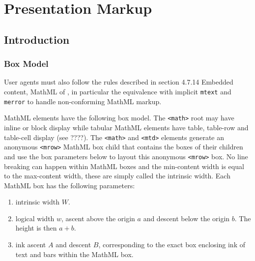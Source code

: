 \section{Presentation Markup}

\subsection{Introduction}

\subsubsection{Box Model}

User agents must also follow the rules described in section 4.7.14
Embedded content, MathML of \cite{HTML5}, in particular the equivalence with
implicit {\tt mtext} and {\tt merror} to handle non-conforming MathML markup.

MathML elements have the following box model. The {\tt <math>} root may have
inline or block display while tabular MathML elements have table, table-row and
table-cell display (see ????). The {\tt <math>} and {\tt <mtd>} elements
generate an anonymous {\tt <mrow>} MathML box child that contains the boxes of
their children and use the box parameters below to layout this anonymous
{\tt <mrow>} box.
No line breaking can happen within MathML boxes and the min-content width is
equal to the max-content width, these are simply called the intrinsic width.
Each MathML box has the following parameters:

\begin{enumerate}
\item intrinsic width $W$.
\item logical width $w$, ascent above the origin $a$ and descent below the
  origin $b$. The height is then $a+b$.
\item ink ascent $A$ and descent $B$, corresponding to the exact box enclosing
  ink of text and bars within the MathML box.
\end{enumerate}

\begin{figure}
\centering
{}
\label{MathMLBoxModel}
\end{figure}


